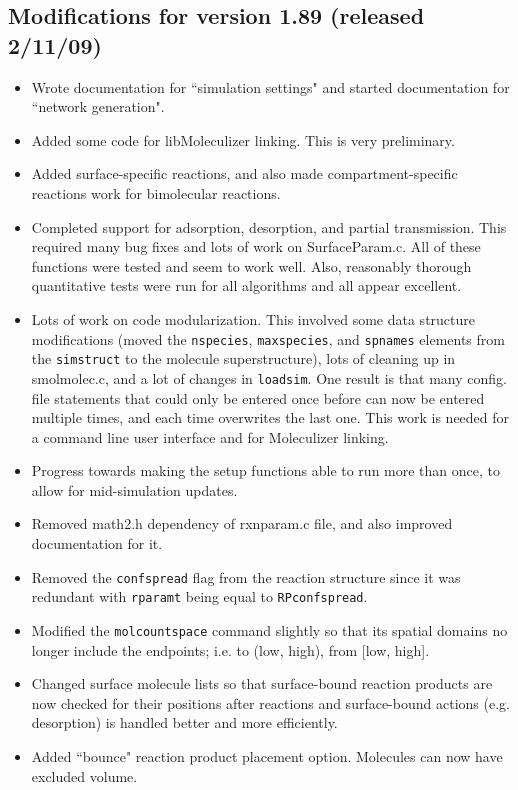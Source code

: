 \documentclass {scrbook}
\newcommand {\ttt} {\texttt}
\begin{document}
\subsection{Modifications for version 1.89 (released 2/11/09)}
\begin{itemize}
\item Wrote documentation for ``simulation settings" and started documentation for ``network generation".
\item Added some code for libMoleculizer linking. This is very preliminary.
\item Added surface-specific reactions, and also made compartment-specific reactions work for bimolecular reactions.
\item Completed support for adsorption, desorption, and partial transmission. This required many bug fixes and lots of work on SurfaceParam.c. All of these functions were tested and seem to work well. Also, reasonably thorough quantitative tests were run for all algorithms and all appear excellent.
\item Lots of work on code modularization. This involved some data structure modifications (moved the \ttt{nspecies}, \ttt{maxspecies}, and \ttt{spnames} elements from the \ttt{simstruct} to the molecule superstructure), lots of cleaning up in smolmolec.c, and a lot of changes in \ttt{loadsim}. One result is that many config. file statements that could only be entered once before can now be entered multiple times, and each time overwrites the last one. This work is needed for a command line user interface and for Moleculizer linking.
\item Progress towards making the setup functions able to run more than once, to allow for mid-simulation updates.
\item Removed math2.h dependency of rxnparam.c file, and also improved documentation for it.
\item Removed the \ttt{confspread} flag from the reaction structure since it was redundant with \ttt{rparamt} being equal to \ttt{RPconfspread}.
\item Modified the \ttt{molcountspace} command slightly so that its spatial domains no longer include the endpoints; i.e. to (low, high), from [low, high].
\item Changed surface molecule lists so that surface-bound reaction products are now checked for their positions after reactions and surface-bound actions (e.g. desorption) is handled better and more efficiently.
\item Added ``bounce" reaction product placement option. Molecules can now have excluded volume.
\end{itemize}
\end{document}
